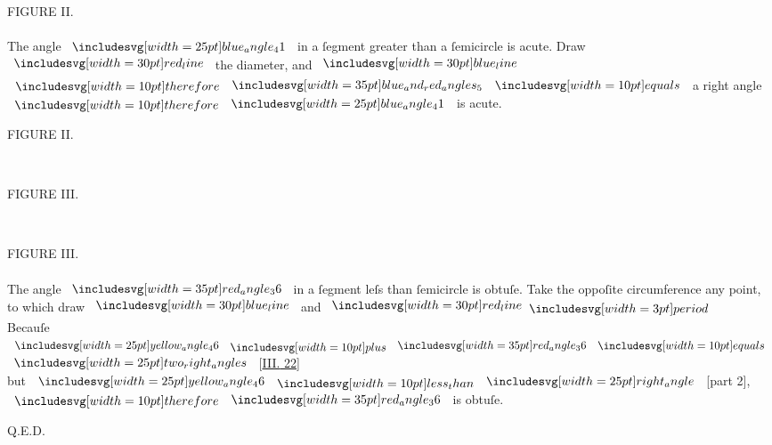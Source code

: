 \documentclass[12pt,preview]{standalone}
\begin{document}
\vspace{\baselineskip}

\begin{minipage}[t]{0.54\textwidth}
    \vspace{0pt}

    \begin{center}
        FIGURE II.\\
        \hfill\\
        The angle $\img{blue_angle_41}$ in a ſegment greater than a ſemicircle is acute.  Draw $\redline$ the diameter, and $\blueline$\\
        $\btherefore \img[0][0][35]{blue_and_red_angles_5} \bequals$ a right angle\\ $\btherefore \img{blue_angle_41}$ is acute.
    \end{center}
\end{minipage}%
\hfill
\begin{minipage}[t]{0.43\textwidth}
    \vspace{0pt}
    \begin{center}
        FIGURE II.
    \end{center}
    \hfill\\
    
\end{minipage}%

\hfill

\begin{minipage}[t]{0.43\textwidth}
    \vspace{0pt}
    \begin{center}
        FIGURE III.
    \end{center}
    \hfill\\
    
\end{minipage}%
\hfill
\begin{minipage}[t]{0.54\textwidth}
    \vspace{0pt}

    \begin{center}
        FIGURE III.\\
        \hfill\\
        The angle $\img[0][0][35]{red_angle_36}$ in a ſegment leſs than ſemicircle is obtuſe.  Take the oppoſite circumference any point, to which draw $\blueline$ and $\redline \bperiod$
        \hfill\\
        Becauſe $\img{yellow_angle_46} \bplus \img[0][0][35]{red_angle_36} \bequals$\\
        $\img{two_right_angles}$ [\hyperref[book3pr22]{\textsc{III.} 22}]\\
        but $\img{yellow_angle_46} \blt \img{right_angle}$ [part 2], $\btherefore \img[0][0][35]{red_angle_36}$ is obtuſe.
    \end{center}

\end{minipage}%

\hfill

\hfill Q.E.D.
\end{document}
